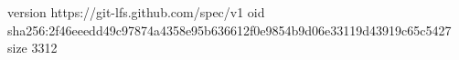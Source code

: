 version https://git-lfs.github.com/spec/v1
oid sha256:2f46eeedd49c97874a4358e95b636612f0e9854b9d06e33119d43919c65c5427
size 3312
